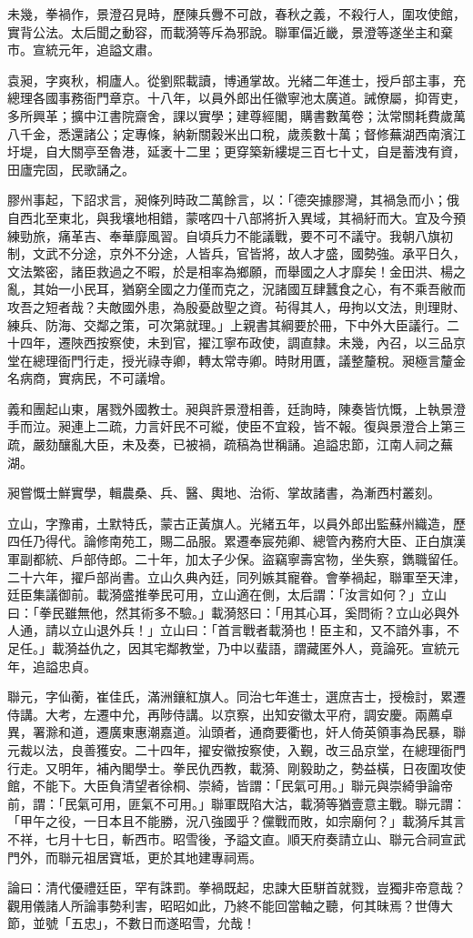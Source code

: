 \begin{pinyinscope}
未幾，拳禍作，景澄召見時，歷陳兵釁不可啟，春秋之義，不殺行人，圍攻使館，實背公法。太后聞之動容，而載漪等斥為邪說。聯軍偪近畿，景澄等遂坐主和棄市。宣統元年，追謚文肅。

袁昶，字爽秋，桐廬人。從劉熙載讀，博通掌故。光緒二年進士，授戶部主事，充總理各國事務衙門章京。十八年，以員外郎出任徽寧池太廣道。誡僚屬，抑胥吏，多所興革；擴中江書院齋舍，課以實學；建尊經閣，購書數萬卷；汰常關耗費歲萬八千金，悉還諸公；定專條，納新關穀米出口稅，歲羨數十萬；督修蕪湖西南濱江圩堤，自大關亭至魯港，延袤十二里；更穿築新縷堤三百七十丈，自是蓄洩有資，田廬完固，民歌誦之。

膠州事起，下詔求言，昶條列時政二萬餘言，以：「德突據膠灣，其禍急而小；俄自西北至東北，與我壤地相錯，蒙喀四十八部將折入異域，其禍紆而大。宜及今預練勁旅，痛革吉、奉華靡風習。自頃兵力不能議戰，要不可不議守。我朝八旗初制，文武不分途，京外不分途，人皆兵，官皆將，故人才盛，國勢強。承平日久，文法繁密，諸臣救過之不暇，於是相率為鄉願，而舉國之人才靡矣！金田洪、楊之亂，其始一小民耳，猶窮全國之力僅而克之，況諸國互肆蠶食之心，有不乘吾敝而攻吾之短者哉？夫敵國外患，為殷憂啟聖之資。茍得其人，毋拘以文法，則理財、練兵、防海、交鄰之策，可次第就理。」上親書其綱要於冊，下中外大臣議行。二十四年，遷陜西按察使，未到官，擢江寧布政使，調直隸。未幾，內召，以三品京堂在總理衙門行走，授光祿寺卿，轉太常寺卿。時財用匱，議整釐稅。昶極言釐金名病商，實病民，不可議增。

義和團起山東，屠戮外國教士。昶與許景澄相善，廷詢時，陳奏皆忼慨，上執景澄手而泣。昶連上二疏，力言奸民不可縱，使臣不宜殺，皆不報。復與景澄合上第三疏，嚴劾釀亂大臣，未及奏，已被禍，疏稿為世稱誦。追謚忠節，江南人祠之蕪湖。

昶嘗慨士鮮實學，輯農桑、兵、醫、輿地、治術、掌故諸書，為漸西村叢刻。

立山，字豫甫，土默特氏，蒙古正黃旗人。光緒五年，以員外郎出監蘇州織造，歷四任乃得代。論修南苑工，賜二品服。累遷奉宸苑卿、總管內務府大臣、正白旗漢軍副都統、戶部侍郎。二十年，加太子少保。盜竊寧壽宮物，坐失察，鐫職留任。二十六年，擢戶部尚書。立山久典內廷，同列嫉其寵眷。會拳禍起，聯軍至天津，廷臣集議御前。載漪盛推拳民可用，立山適在側，太后謂：「汝言如何？」立山曰：「拳民雖無他，然其術多不驗。」載漪怒曰：「用其心耳，奚問術？立山必與外人通，請以立山退外兵！」立山曰：「首言戰者載漪也！臣主和，又不諳外事，不足任。」載漪益仇之，因其宅鄰教堂，乃中以蜚語，謂藏匿外人，竟論死。宣統元年，追謚忠貞。

聯元，字仙蘅，崔佳氏，滿洲鑲紅旗人。同治七年進士，選庶吉士，授檢討，累遷侍講。大考，左遷中允，再陟侍講。以京察，出知安徽太平府，調安慶。兩薦卓異，署滁和道，遷廣東惠潮嘉道。汕頭者，通商要衢也，奸人倚英領事為民暴，聯元裁以法，良善獲安。二十四年，擢安徽按察使，入覲，改三品京堂，在總理衙門行走。又明年，補內閣學士。拳民仇西教，載漪、剛毅助之，勢益橫，日夜圍攻使館，不能下。大臣負清望者徐桐、崇綺，皆謂：「民氣可用。」聯元與崇綺爭論帝前，謂：「民氣可用，匪氣不可用。」聯軍既陷大沽，載漪等猶壹意主戰。聯元謂：「甲午之役，一日本且不能勝，況八強國乎？儻戰而敗，如宗廟何？」載漪斥其言不祥，七月十七日，斬西市。昭雪後，予謚文直。順天府奏請立山、聯元合祠宣武門外，而聯元祖居寶坻，更於其地建專祠焉。

論曰：清代優禮廷臣，罕有誅罰。拳禍既起，忠諫大臣駢首就戮，豈獨非帝意哉？觀用儀諸人所論事勢利害，昭昭如此，乃終不能回當軸之聽，何其昧焉？世傳大節，並號「五忠」，不數日而遂昭雪，允哉！


\end{pinyinscope}